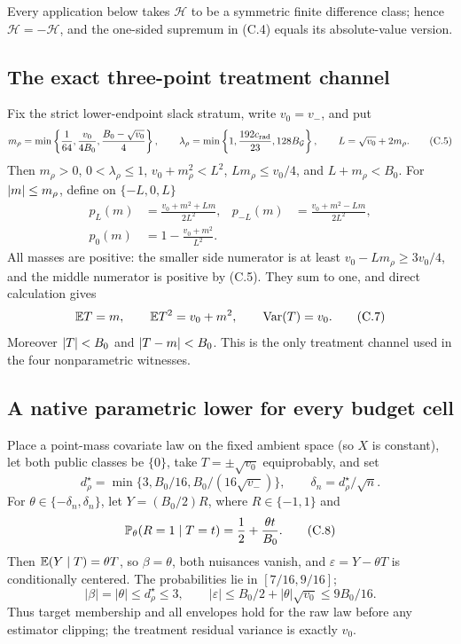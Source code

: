 Every application below takes \(\mathcal H\) to be a symmetric finite
difference class; hence \(\mathcal H=-\mathcal H\), and the one-sided supremum
in (C.4) equals its absolute-value version.

\subsection{The exact three-point treatment channel}
\label{app:three-point}

Fix the strict lower-endpoint slack stratum, write \(v_0=v_-\), and put
\[
 m_\rho=\min\left\{\frac1{64},\frac{v_0}{4B_0},
                 \frac{B_0-\sqrt{v_0}}4\right\},\qquad
 \lambda_\rho=\min\left\{1,\frac{192c_{\rm rad}}{23},
                         128B_{\mathcal G}\right\},\qquad
 L=\sqrt{v_0}+2m_\rho.
 \tag{C.5}
\]
Then \(m_\rho>0\), \(0<\lambda_\rho\le1\),
\(v_0+m_\rho^2<L^2\),
\(Lm_\rho\le v_0/4\), and \(L+m_\rho<B_0\).
For \(\lvert m\rvert\le m_\rho\), define on \(\{-L,0,L\}\)
\begin{align}
 p_L(m)&=\frac{v_0+m^2+Lm}{2L^2},&
 p_{-L}(m)&=\frac{v_0+m^2-Lm}{2L^2},\nonumber\\
 p_0(m)&=1-\frac{v_0+m^2}{L^2}.
 \tag{C.6}
\end{align}
All masses are positive: the smaller side numerator is at least
\(v_0-Lm_\rho\ge3v_0/4\), and the middle numerator is positive by (C.5).
They sum to one, and direct calculation gives
\[
 \mathbb E T=m,\qquad \mathbb E T^2=v_0+m^2,\qquad
 \operatorname{Var}(T)=v_0.
 \tag{C.7}
\]
Moreover \(\lvert T\rvert<B_0\) and \(\lvert T-m\rvert<B_0\).  This is the only treatment
channel used in the four nonparametric witnesses.

\subsection{A native parametric lower for every budget cell}
\label{app:q-lower}

Place a point-mass covariate law on the fixed ambient space (so \(X\) is
constant), let both public classes be \(\{0\}\), take
\(T=\pm\sqrt{v_0}\) equiprobably, and set
\[
 d_\rho^\star=
 \min\{3,B_0/16,B_0/(16\sqrt{v_-})\},\qquad
 \delta_n=d_\rho^\star/\sqrt n.
\]
For \(\theta\in\{-\delta_n,\delta_n\}\), let \(Y=(B_0/2)R\), where \(R\in\{-1,1\}\) and
\[
 \mathbb P_\theta(R=1\mid T=t)=\frac12+\frac{\theta t}{B_0}.
 \tag{C.8}
\]
Then \(\mathbb E(Y\mid T)=\theta T\), so \(\beta=\theta\), both nuisances vanish,
and \(\varepsilon=Y-\theta T\) is conditionally centered.  The probabilities
lie in \([7/16,9/16]\);
\[
 |\beta|=|\theta|\le d_\rho^\star\le3,\qquad
 |\varepsilon|\le B_0/2+|\theta|\sqrt{v_0}\le9B_0/16.
\]
Thus target membership and all envelopes hold for the raw law before any
estimator clipping; the treatment residual variance is exactly \(v_0\).

